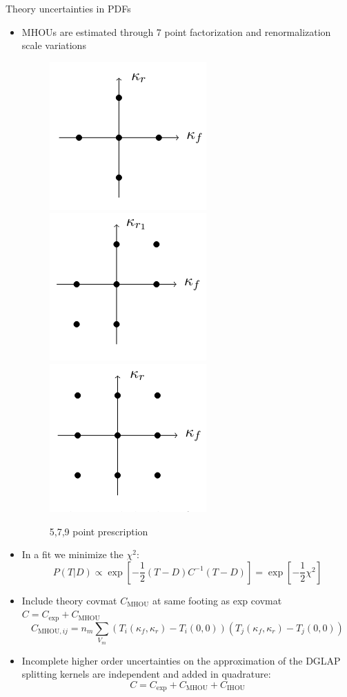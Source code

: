 \documentclass[8pt,t]{beamer}
\begin{document}
\begin{frame}{Theory uncertainties in PDFs}
  \vspace*{1em}
  \begin{itemize}
    \item MHOUs are estimated through 7 point factorization and renormalization scale variations \\
    \begin{figure}
      \includegraphics[width=.2\textwidth]{figures/5point.png}
      \includegraphics[width=.2\textwidth]{figures/7point.png}
      \includegraphics[width=.2\textwidth]{figures/9point.png}
      \caption*{5,7,9 point prescription}
    \end{figure}
    \item In a fit we minimize the $\chi^2$: \\
    $$P(T|D) \propto \exp\left[-\frac{1}{2}\left(T-D\right)C^{-1}\left(T-D\right)\right] = \exp\left[-\frac{1}{2}\chi^2\right]$$
    \item Include theory covmat $C_\mathrm{MHOU}$ at same footing as exp covmat $C = C_\mathrm{exp}+C_\mathrm{MHOU}$ \\
    $$C_{\mathrm{MHOU},ij} = n_{m}\sum_{V_{m}}\left(T_{i}(\kappa_f, \kappa_r) - T_{i}(0, 0)\right)\left(T_{j}(\kappa_f, \kappa_r) - T_{j}(0, 0)\right)$$
    \item Incomplete higher order uncertainties on the approximation of the DGLAP splitting kernels are independent and added in quadrature: \\
    $$C = C_\mathrm{exp}+C_\mathrm{MHOU} + C_\mathrm{IHOU} $$
  \end{itemize}


\end{frame}
\end{document}
